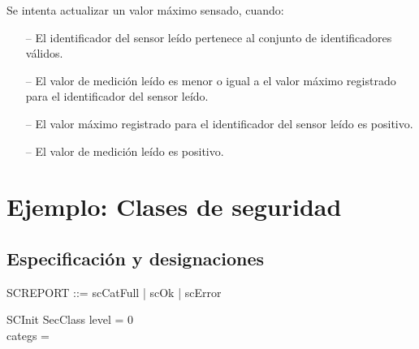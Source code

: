 
\begin{tcolorbox}[colback=gray!5!white,colframe=gray!50!black,
  colbacktitle=gray!75!black,title=KeepMaxReading\_SP\_14]
  Se intenta actualizar un valor máximo sensado, cuando:
     \begin{itemize}
        \item[--]{El identificador del sensor leído pertenece al conjunto de identificadores válidos.} 
        \item[--]{El valor de medición leído es menor o igual a el valor máximo registrado para el identificador del sensor leído.}
        \item[--]{El valor máximo registrado para el identificador del sensor leído es positivo.}
        \item[--]{El valor de medición leído es positivo.}
     \end{itemize}
\end{tcolorbox}

\section*{Ejemplo: Clases de seguridad}

\subsection*{Especificación y designaciones}

\begin{zed}
[CATEGORY] \also

SCREPORT ::= scCatFull | scOk | scError
\end{zed}


\begin{schema}{SCInit}
SecClass
\where
level = 0 \\
categs = \emptyset
\end{schema}

